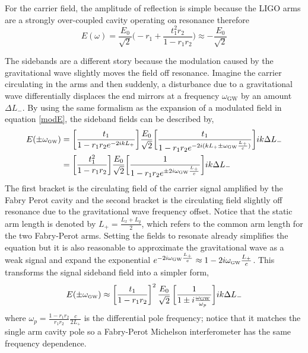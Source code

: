 		For the carrier field, the amplitude of reflection is simple because the LIGO arms are a strongly over-coupled cavity operating on resonance therefore 
		\begin{equation}
			E(\omega) = \frac{E_0}{\sqrt{2}}  \bigg(-r_1 + \frac{t_1^2 r_2}{1-r_1 r_2} \bigg) \approx -\frac{E_0}{\sqrt{2}}
		\end{equation}
		
		The sidebands are a different story because the modulation caused by the gravitational wave slightly moves the field off resonance.  Imagine the carrier circulating in the arms and then suddenly, a disturbance due to a gravitational wave differentially displaces the end mirrors at a frequency $\omega_\text{GW}$ by an amount $\Delta L_{-}$.   By using the same formalism as the expansion of a modulated field in equation \ref{modE}, the sideband fields can be described by,
		\begin{equation}
		\begin{aligned}\label{Egw}
			E(\pm \omega_{\text{\tiny GW}}) &= \bigg[ \frac{t_1}{1-r_1 r_2 e^{-2ik L_+ }}\bigg] \frac{E_0}{\sqrt{2}} \bigg[\frac{t_1}{1-r_1 r_2 e^{-2i (k L_+ \pm \omega_{\text{\tiny GW}}  \frac{L_+}{c})}} \bigg] ik\Delta L_{-}\\
			& =  \bigg[ \frac{t_1^2}{1-r_1 r_2}\bigg]  \frac{E_0}{\sqrt{2}} \bigg[\frac{ 1}{1-r_1 r_2 e^{\pm 2i  \omega_{\text{\tiny GW}}  \frac{L_+}{c}}} \bigg] ik\Delta L_{-}
		\end{aligned}
		\end{equation}
		The first bracket is the circulating field of the carrier signal amplified by the Fabry Perot cavity and the second bracket is the circulating field slightly off resonance due to the gravitational wave frequency offset.  Notice that the static arm length is denoted by $L_+ = \frac{L_x + L_y}{2}$, which refers to the common arm length for the two Fabry-Perot arms.  Setting the fields to resonate already simplifies the equation but it is also reasonable to approximate the gravitational wave as a weak signal and expand the exponential $e^{- 2i \omega_{\text{\tiny GW}}  \frac{L_+}{c}} \approx 1 - 2i \omega_{\text{\tiny GW}}  \frac{L_+}{c}$.  This transforms the signal sideband field into a simpler form,
		\begin{equation}\label{eq:e_gw}
		E(\pm \omega_{\text{\tiny GW}}) \approx \bigg[\frac{t_1}{1-r_1r_2}\bigg]^2 \, \frac{E_0}{\sqrt{2}} \, \bigg[\frac{1}{1 \pm i \frac{\omega_{\text{\tiny GW}}}{\omega_p}}\bigg] ik\Delta L_{-}
		\end{equation}
		where $\omega_p = \frac{1-r_1r_2}{r_1r_2}\frac{c}{2L_+}$ is the differential pole frequency; notice that it matches the single arm cavity pole so a Fabry-Perot Michelson interferometer has the same frequency dependence.
		
